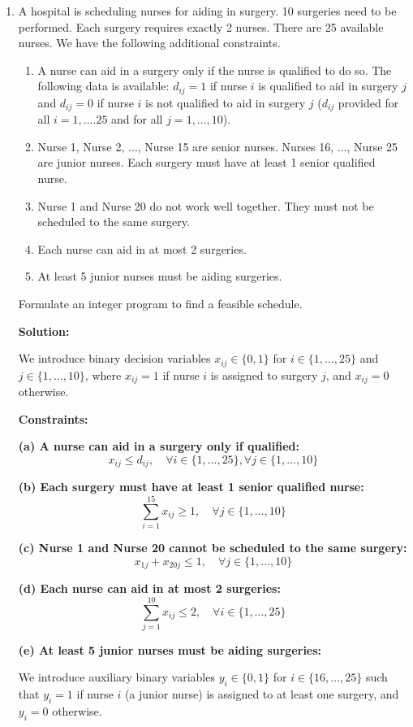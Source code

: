 \documentclass{article}
\begin{document}
\begin{enumerate}
 \item A hospital is scheduling nurses for aiding in surgery. 10 surgeries need to be performed. Each surgery requires exactly 2 nurses. There are 25 available nurses. We have the following additional constraints.
\begin{enumerate}
\item A nurse can aid in a surgery only if the nurse is qualified to do so. The following data is available: $d_{ij} = 1$ if nurse $i$ is qualified to aid in surgery $j$ and $d_{ij} = 0$ if nurse $i$ is not qualified to aid in surgery $j$ ($d_{ij}$ provided for all $i = 1, ....25$ and for all $j = 1, ..., 10$).
\item Nurse 1, Nurse 2, ..., Nurse 15 are senior nurses. Nurses 16, ..., Nurse 25 are junior nurses. Each surgery must have at least 1 senior qualified nurse.
\item  Nurse 1 and Nurse 20 do not work well together. They must not be scheduled to the same surgery.
\item Each nurse can aid in at most 2 surgeries.
\item At least 5 junior nurses must be aiding surgeries.
\end{enumerate}
Formulate an integer program to find a feasible schedule.

\textbf{Solution:}

We introduce binary decision variables $x_{ij} \in \{0,1\}$ for $i \in \{1, \ldots, 25\}$ and $j \in \{1, \ldots, 10\}$, where $x_{ij} = 1$ if nurse $i$ is assigned to surgery $j$, and $x_{ij} = 0$ otherwise.

\textbf{Constraints:}

\textbf{(a) A nurse can aid in a surgery only if qualified:}
\[
x_{ij} \leq d_{ij}, \quad \forall i \in \{1, \ldots, 25\}, \forall j \in \{1, \ldots, 10\}
\]

\textbf{(b) Each surgery must have at least 1 senior qualified nurse:}
\[
\sum_{i=1}^{15} x_{ij} \geq 1, \quad \forall j \in \{1, \ldots, 10\}
\]

\textbf{(c) Nurse 1 and Nurse 20 cannot be scheduled to the same surgery:}
\[
x_{1j} + x_{20j} \leq 1, \quad \forall j \in \{1, \ldots, 10\}
\]

\textbf{(d) Each nurse can aid in at most 2 surgeries:}
\[
\sum_{j=1}^{10} x_{ij} \leq 2, \quad \forall i \in \{1, \ldots, 25\}
\]

\textbf{(e) At least 5 junior nurses must be aiding surgeries:}

We introduce auxiliary binary variables $y_i \in \{0,1\}$ for $i \in \{16, \ldots, 25\}$ such that $y_i = 1$ if nurse $i$ (a junior nurse) is assigned to at least one surgery, and $y_i = 0$ otherwise.


\end{enumerate}
\end{document}
